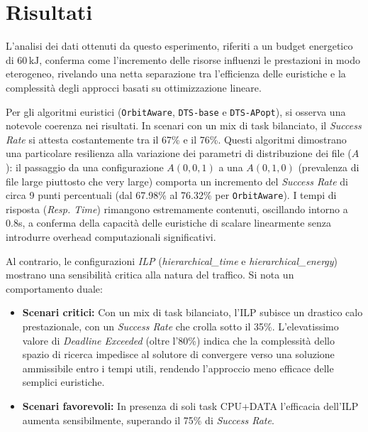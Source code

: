 \documentclass[12pt]{article}
\begin{document}
\section{Risultati}


L'analisi dei dati ottenuti da questo esperimento, riferiti a un budget energetico di $60\,\mathrm{kJ}$, conferma come l'incremento delle risorse influenzi le prestazioni in modo eterogeneo, rivelando una netta separazione tra l'efficienza delle euristiche e la complessità degli approcci basati su ottimizzazione lineare.

Per gli algoritmi euristici (\texttt{OrbitAware}, \texttt{DTS-base} e \texttt{DTS-APopt}), si osserva una notevole coerenza nei risultati. In scenari con un mix di task bilanciato, il \textit{Success Rate} si attesta costantemente tra il 67\% e il 76\%. Questi algoritmi dimostrano una particolare resilienza alla variazione dei parametri di distribuzione dei file ($A$): il passaggio da una configurazione $A(0,0,1)$ a una $A(0,1,0)$ (prevalenza di file large piuttosto che very large) comporta un incremento del \textit{Success Rate} di circa 9 punti percentuali (dal 67.98\% al 76.32\% per \texttt{OrbitAware}). I tempi di risposta (\textit{Resp. Time}) rimangono estremamente contenuti, oscillando intorno a 0.8s, a conferma della capacità delle euristiche di scalare linearmente senza introdurre overhead computazionali significativi.

Al contrario, le configurazioni \textit{ILP} (\textit{hierarchical\_time} e \textit{hierarchical\_energy}) mostrano una sensibilità critica alla natura del traffico. Si nota un comportamento duale:
\begin{itemize}
    \item \textbf{Scenari critici:} Con un mix di task bilanciato, l'ILP subisce un drastico calo prestazionale, con un \textit{Success Rate} che crolla sotto il 35\%. L'elevatissimo valore di \textit{Deadline Exceeded} (oltre l'80\%) indica che la complessità dello spazio di ricerca impedisce al solutore di convergere verso una soluzione ammissibile entro i tempi utili, rendendo l'approccio meno efficace delle semplici euristiche.
    \item \textbf{Scenari favorevoli:} In presenza di soli task CPU+DATA l'efficacia dell'ILP aumenta sensibilmente, superando il 75\% di \textit{Success Rate}. 
\end{itemize}
\end{document}
